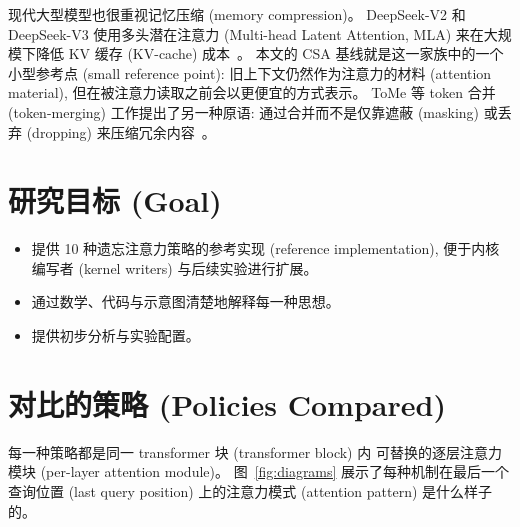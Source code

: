 \documentclass[10pt,UTF8]{ctexart}
\begin{document}
现代大型模型也很重视记忆压缩 (memory compression)。
DeepSeek-V2 和 DeepSeek-V3 使用多头潜在注意力 (Multi-head Latent Attention, MLA)
来在大规模下降低 KV 缓存 (KV-cache) 成本~\cite{deepseek_v2,deepseek_v3}。
本文的 CSA 基线就是这一家族中的一个小型参考点 (small reference point):
旧上下文仍然作为注意力的材料 (attention material),
但在被注意力读取之前会以更便宜的方式表示。
ToMe 等 token 合并 (token-merging) 工作提出了另一种原语:
通过合并而不是仅靠遮蔽 (masking) 或丢弃 (dropping) 来压缩冗余内容~\cite{tome}。

\section{研究目标 (Goal)}

\begin{itemize}
\item 提供 10 种遗忘注意力策略的参考实现 (reference implementation),
便于内核编写者 (kernel writers) 与后续实验进行扩展。
\item 通过数学、代码与示意图清楚地解释每一种思想。
\item 提供初步分析与实验配置。
\end{itemize}

\section{对比的策略 (Policies Compared)}

每一种策略都是同一 transformer 块 (transformer block) 内
可替换的逐层注意力模块 (per-layer attention module)。
图~\ref{fig:diagrams} 展示了每种机制在最后一个查询位置 (last query position)
上的注意力模式 (attention pattern) 是什么样子的。
\end{document}
